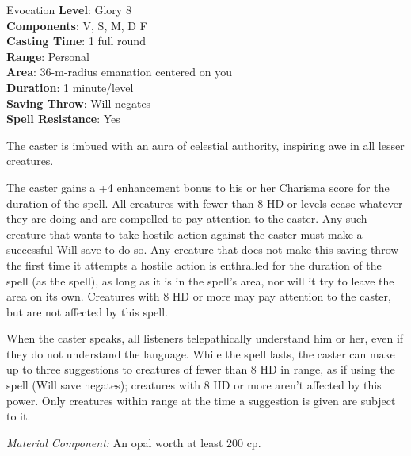 {Evocation}
{
	\textbf{Level}: Glory 8\\
	\textbf{Components}: V, S, M, D F\\
	\textbf{Casting Time}: 1 full round\\
	\textbf{Range}: Personal\\
	\textbf{Area}: 36-m-radius emanation centered on you\\
	\textbf{Duration}: 1 minute/level\\
	\textbf{Saving Throw}: Will negates\\
	\textbf{Spell Resistance}: Yes\\
}
{
	The caster is imbued with an aura of celestial authority, inspiring awe in all lesser creatures.
	
	The caster gains a +4 enhancement bonus to his or her Charisma score for the duration of the spell. All creatures with fewer than 8 HD or levels cease whatever they are doing and are compelled to pay attention to the caster. Any such creature that wants to take hostile action against the caster must make a successful Will save to do so. Any creature that does not make this saving throw the first time it attempts a hostile action is enthralled for the duration of the spell (as the  spell), as long as it is in the spell's area, nor will it try to leave the area on its own. Creatures with 8 HD or more may pay attention to the caster, but are not affected by this spell.

	When the caster speaks, all listeners telepathically understand him or her, even if they do not understand the language. While the spell lasts, the caster can make up to three suggestions to creatures of fewer than 8 HD in range, as if using the  spell (Will save negates); creatures with 8 HD or more aren't affected by this power. Only creatures within range at the time a suggestion is given are subject to it.

	\textit{Material Component:} An opal worth at least 200 cp.
}